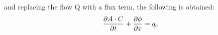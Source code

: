 and replacing the flow Q with a flux term, the following is obtained:
\begin{equation}
	\frac{\partial A \cdot C}{\partial t} + \frac{\partial \phi}{\partial x}=q_c \\
\label{poop_mass_equation}
\end{equation}










